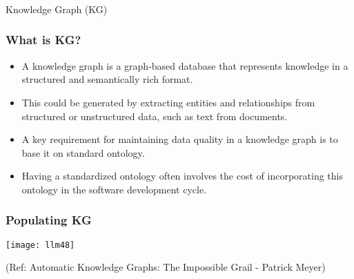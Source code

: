 \begin{frame}[fragile]\frametitle{}
\begin{center}
{\Large Knowledge Graph (KG)}

\end{center}
\end{frame}

\begin{frame}[fragile]\frametitle{What is KG?}

\begin{itemize}
\item A knowledge graph is a graph-based database that represents knowledge in a structured and semantically rich format. 
\item This could be generated by extracting entities and relationships from structured or unstructured data, such as text from documents. 
\item A key requirement for maintaining data quality in a knowledge graph is to base it on standard ontology. 
\item Having a standardized ontology often involves the cost of incorporating this ontology in the software development cycle.
\end{itemize}

\end{frame}

\begin{frame}[fragile]\frametitle{Populating KG}

\begin{center}
\texttt{[image: llm48]}
\end{center}

{\tiny (Ref: Automatic Knowledge Graphs: The Impossible Grail - Patrick Meyer)}

\end{frame}

